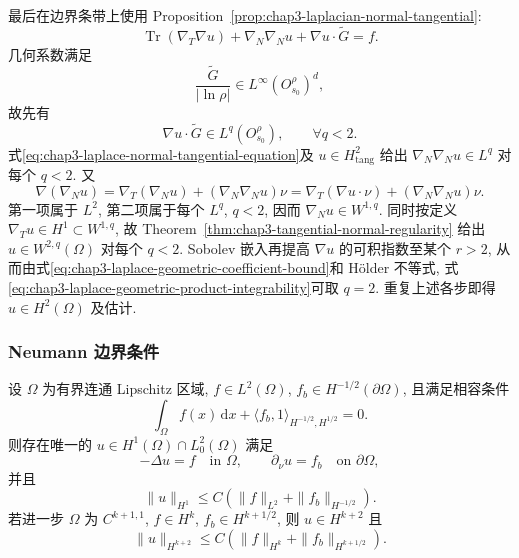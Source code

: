 \begin{Proof}
最后在边界条带上使用 Proposition~\ref{prop:chap3-laplacian-normal-tangential}:
\begin{equation}
 \operatorname{Tr}(\nabla_T\nabla u)+\nabla_N\nabla_Nu
 +\nabla u\cdot\widetilde G=f.
 \label{eq:chap3-laplace-normal-tangential-equation}
\end{equation}
几何系数满足
\begin{equation}
 \frac{\widetilde G}{|\ln\rho|}\in L^\infty(O_{s_0}^\rho)^d,
 \label{eq:chap3-laplace-geometric-coefficient-bound}
\end{equation}
故先有
\begin{equation}
 \nabla u\cdot\widetilde G\in L^q(O_{s_0}^\rho),
 \qquad\forall q<2.
 \label{eq:chap3-laplace-geometric-product-integrability}
\end{equation}
式\eqref{eq:chap3-laplace-normal-tangential-equation}及 $u\in H_{\mathrm{tang}}^2$ 给出 $\nabla_N\nabla_Nu\in L^q$ 对每个 $q<2$. 又
\[
 \nabla(\nabla_Nu)=\nabla_T(\nabla_Nu)+(\nabla_N\nabla_Nu)\nu
 =\nabla_T(\nabla u\cdot\nu)+(\nabla_N\nabla_Nu)\nu.
\]
第一项属于 $L^2$, 第二项属于每个 $L^q$, $q<2$, 因而 $\nabla_Nu\in W^{1,q}$. 同时按定义 $\nabla_Tu\in H^1\subset W^{1,q}$, 故 Theorem~\ref{thm:chap3-tangential-normal-regularity} 给出 $u\in W^{2,q}(\Omega)$ 对每个 $q<2$. Sobolev 嵌入再提高 $\nabla u$ 的可积指数至某个 $r>2$, 从而由式\eqref{eq:chap3-laplace-geometric-coefficient-bound}和 H\"older 不等式, 式\eqref{eq:chap3-laplace-geometric-product-integrability}可取 $q=2$. 重复上述各步即得 $u\in H^2(\Omega)$ 及估计.
\end{Proof}

\subsubsection{Neumann 边界条件}
\label{subsec:chap3-laplace-neumann}

\begin{Theorem}
\label{thm:chap3-laplace-neumann}
设 $\Omega$ 为有界连通 Lipschitz 区域, $f\in L^2(\Omega)$, $f_b\in H^{-1/2}(\partial\Omega)$, 且满足相容条件
\begin{equation}
 \int_\Omega f(x)\,\mathrm dx
 +\langle f_b,1\rangle_{H^{-1/2},H^{1/2}}=0.
 \label{eq:chap3-neumann-compatibility}
\end{equation}
则存在唯一的 $u\in H^1(\Omega)\cap L_0^2(\Omega)$ 满足
\[
 -\Delta u=f\quad\text{in }\Omega,
 \qquad\partial_\nu u=f_b\quad\text{on }\partial\Omega,
\]
并且
\begin{equation}
 \|u\|_{H^1}\leq C(\|f\|_{L^2}+\|f_b\|_{H^{-1/2}}).
 \label{eq:chap3-neumann-energy-bound}
\end{equation}
若进一步 $\Omega$ 为 $C^{k+1,1}$, $f\in H^k$, $f_b\in H^{k+1/2}$, 则 $u\in H^{k+2}$ 且
\[
 \|u\|_{H^{k+2}}\leq C(\|f\|_{H^k}+\|f_b\|_{H^{k+1/2}}).
\]
\end{Theorem}

